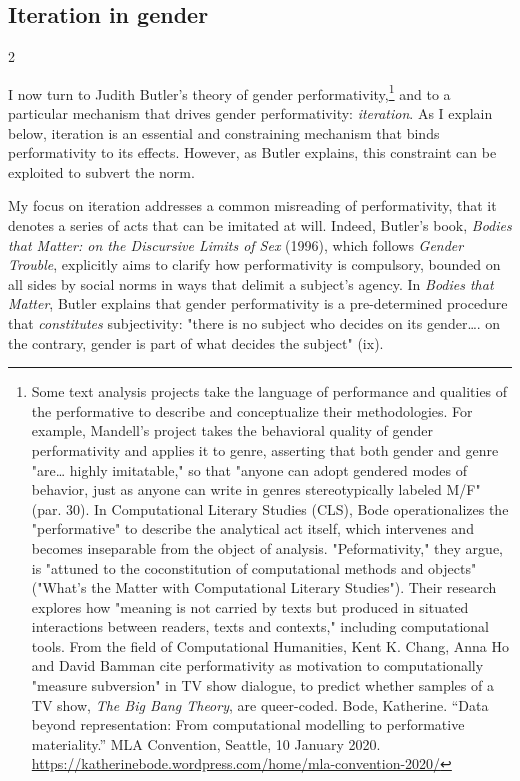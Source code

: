 \documentclass[11pt]{article}
\begin{document}
\subsection{Iteration in gender}
\label{sec:orgfe9ba13}
2

I now turn to Judith Butler's theory of gender performativity,\footnote{Some text analysis projects take the language of performance
and qualities of the performative to describe and conceptualize their
methodologies. For example, Mandell's project takes the behavioral
quality of gender performativity and applies it to genre, asserting
that both gender and genre "are\ldots{} highly imitatable," so that "anyone
can adopt gendered modes of behavior, just as anyone can write in
genres stereotypically labeled M/F" (par. 30). In Computational
Literary Studies (CLS), Bode operationalizes the "performative" to
describe the analytical act itself, which intervenes and becomes
inseparable from the object of analysis. "Peformativity," they argue,
is "attuned to the coconstitution of computational methods and
objects" ("What's the Matter with Computational Literary Studies").
Their research explores how "meaning is not carried by texts but
produced in situated interactions between readers, texts and
contexts," including computational tools. From the field of
Computational Humanities, Kent K. Chang, Anna Ho and David Bamman cite
performativity as motivation to computationally "measure subversion"
in TV show dialogue, to predict whether samples of a TV show, \emph{The Big
Bang Theory}, are queer-coded. Bode, Katherine. “Data beyond
representation: From computational modelling to performative
materiality.” MLA Convention, Seattle, 10 January 2020.
\url{https://katherinebode.wordpress.com/home/mla-convention-2020/}}
and to a particular mechanism that drives gender performativity:
\emph{iteration}. As I explain below, iteration is an essential and
constraining mechanism that binds performativity to its effects.
However, as Butler explains, this constraint can be exploited to
subvert the norm. 

My focus on iteration addresses a common misreading of performativity,
that it denotes a series of acts that can be imitated at will. Indeed,
Butler's book, \emph{Bodies that Matter: on the Discursive Limits of Sex}
(1996), which follows \emph{Gender Trouble}, explicitly aims to clarify how
performativity is compulsory, bounded on all sides by social norms in
ways that delimit a subject's agency. In \emph{Bodies that Matter}, Butler
explains that gender performativity is a pre-determined procedure that
\emph{constitutes} subjectivity: "there is no subject who decides on its
gender\ldots{}. on the contrary, gender is part of what decides the
subject" (ix).
\end{document}
